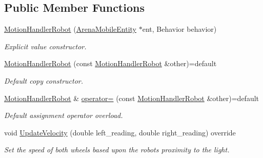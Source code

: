 \subsection*{Public Member Functions}
\begin{DoxyCompactItemize}
\item 
\mbox{\label{class_motion_handler_robot_a000adbb625eb8954e648d0f14afa7b12}} 
\mbox{\hyperlink{class_motion_handler_robot_a000adbb625eb8954e648d0f14afa7b12}{Motion\+Handler\+Robot}} (\mbox{\hyperlink{class_arena_mobile_entity}{Arena\+Mobile\+Entity}} $\ast$ent, Behavior behavior)
\begin{DoxyCompactList}\small\item\em Explicit value constructor. \end{DoxyCompactList}\item 
\mbox{\label{class_motion_handler_robot_a66445cc9057e3ef9298b5bd239df6d4e}} 
\mbox{\hyperlink{class_motion_handler_robot_a66445cc9057e3ef9298b5bd239df6d4e}{Motion\+Handler\+Robot}} (const \mbox{\hyperlink{class_motion_handler_robot}{Motion\+Handler\+Robot}} \&other)=default
\begin{DoxyCompactList}\small\item\em Default copy constructor. \end{DoxyCompactList}\item 
\mbox{\label{class_motion_handler_robot_a48181f197ffb864f16e29721ad964e4a}} 
\mbox{\hyperlink{class_motion_handler_robot}{Motion\+Handler\+Robot}} \& \mbox{\hyperlink{class_motion_handler_robot_a48181f197ffb864f16e29721ad964e4a}{operator=}} (const \mbox{\hyperlink{class_motion_handler_robot}{Motion\+Handler\+Robot}} \&other)=default
\begin{DoxyCompactList}\small\item\em Default assignment operator overload. \end{DoxyCompactList}\item 
void \mbox{\hyperlink{class_motion_handler_robot_aba3ad202a5dc1cf13dc1a82308776ecf}{Update\+Velocity}} (double left\+\_\+reading, double right\+\_\+reading) override
\begin{DoxyCompactList}\small\item\em Set the speed of both wheels based upon the robots proximity to the light. \end{DoxyCompactList}\item 

\end{DoxyCompactItemize}

